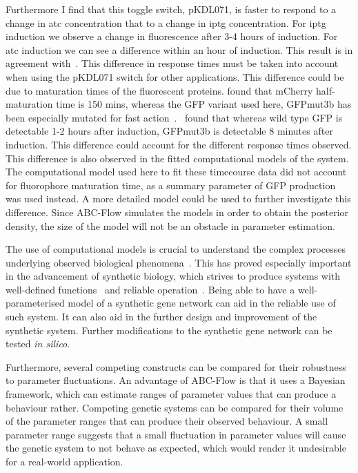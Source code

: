 Furthermore I find that this toggle switch, pKDL071, is faster to respond to a change in \acrshort{atc} concentration that to a change in \acrshort{iptg} concentration. For \acrshort{iptg} induction we observe a change in fluorescence after 3-4 hours of induction. For \acrshort{atc} induction we can see a difference within an hour of induction. This result is in agreement with~\textcite{Litcofsky:2012gr}. This difference in response times must be taken into account when using the pKDL071 switch for other applications. This difference could be due to maturation times of the fluorescent proteins. \textcite{Macdonald:2012el} found that mCherry half-maturation time is 150 mins, whereas the GFP variant used here, GFPmut3b has been especially mutated for fast action~\autocite{Cormack:1996gv}.~\textcite{Cormack:1996gv} found that whereas wild type GFP is detectable 1-2 hours after induction, GFPmut3b is detectable 8 minutes after induction. This difference could account for the different response times observed. This difference is also observed in the fitted computational models of the system. The computational model used here to fit these timecourse data did not account for fluorophore maturation time, as a summary parameter of GFP production was used instead. A more detailed model could be used to further investigate this difference. Since ABC-Flow simulates the models in order to obtain the posterior density, the size of the model will not be an obstacle in parameter estimation.


The use of computational models is crucial to understand the complex processes underlying observed biological phenomena~\autocite{Lillacci:2013hu}. This has proved especially important in the advancement of synthetic biology, which strives to produce systems with well-defined functions~\autocite{Chin:2006fb} and reliable operation~\autocite{Lu:2009ez}. Being able to have a well-parameterised model of a synthetic gene network can aid in the reliable use of such system. It can also aid in the further design and improvement of the synthetic system. Further modifications to the synthetic gene network can be tested \textit{in silico}. 

Furthermore, several competing constructs can be compared for their robustness to parameter fluctuations. An advantage of ABC-Flow is that it uses a Bayesian framework, which can estimate ranges of parameter values that can produce a behaviour rather. Competing genetic systems can be compared for their volume of the parameter ranges that can produce their observed behaviour. A small parameter range suggests that a small fluctuation in parameter values will cause the genetic system to not behave as expected, which would render it undesirable for a real-world application.






